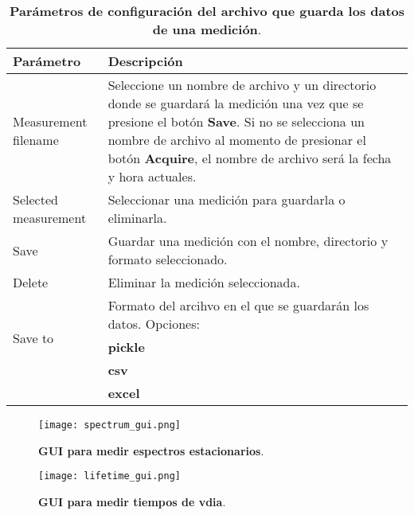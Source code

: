 \begin{table}[htbp]
    \centering
    \begin{tabularx}{\textwidth}{|l|X|}
        \hline
        \textbf{Parámetro} & \textbf{Descripción} \\
        \hline
        Measurement filename & Seleccione un nombre de archivo y un directorio donde se guardará la medición una vez que se presione el botón \textbf{Save}. Si no se selecciona un nombre de archivo al momento de presionar el botón \textbf{Acquire}, el nombre de archivo será la fecha y hora actuales. \\
        \hline
        Selected measurement & Seleccionar una medición para guardarla o eliminarla. \\
        \hline
        Save & Guardar una medición con el nombre, directorio y formato seleccionado. \\
        \hline
        Delete & Eliminar la medición seleccionada. \\
        \hline
        \multirow{3}{3cm}{Save to} & Formato del arcihvo en el que se guardarán los datos. Opciones: \\
        \cline{2-2}
        & \textbf{pickle} \\
        \cline{2-2}
        & \textbf{csv} \\
        \cline{2-2}
        & \textbf{excel} \\
        \hline
    \end{tabularx}
    \caption{\textbf{Parámetros de configuración del archivo que guarda los datos de una medición}.}
    \label{tab:file_parameters}
\end{table}

\begin{figure}
    \centering
    \texttt{[image: spectrum\_gui.png]}
    \caption{\textbf{GUI para medir espectros estacionarios}.}
    \label{fig:spectrum_gui}
\end{figure}

\begin{figure}
    \centering
    \texttt{[image: lifetime\_gui.png]}
    \caption{\textbf{GUI para medir tiempos de vdia}.}
    \label{fig:lifetime_gui}
\end{figure}

